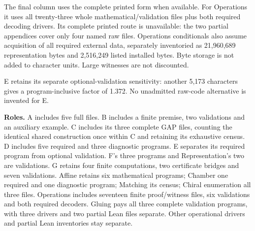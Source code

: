 \documentclass[11pt,a4paper]{article}
\begin{document}
The final column uses the complete printed form when available. For Operations it uses all twenty-three whole mathematical/validation files plus both required decoding drivers. Its complete printed route is unavailable: the two partial appendices cover only four named raw files. Operations conditionals also assume acquisition of all required external data, separately inventoried as 21,960,689 representation bytes and 2,516,249 listed installed bytes. Byte storage is not added to character units. Large witnesses are not discounted.

E retains its separate optional-validation sensitivity: another 5,173 characters gives a program-inclusive factor of 1.372. No unadmitted raw-code alternative is invented for E.

\textbf{Roles.} A includes five full files. B includes a finite premise, two validations and an auxiliary example. C includes its three complete GAP files, counting the identical shared construction once within C and retaining its exhaustive census. D includes five required and three diagnostic programs. E separates its required program from optional validation. F's three programs and Representation's two are validations. G retains four finite computations, two certificate bridges and seven validations. Affine retains six mathematical programs; Chamber one required and one diagnostic program; Matching its census; Chiral enumeration all three files. Operations includes seventeen finite proof/witness files, six validations and both required decoders. Gluing pays all three complete validation programs, with three drivers and two partial Lean files separate. Other operational drivers and partial Lean inventories stay separate.
\end{document}

